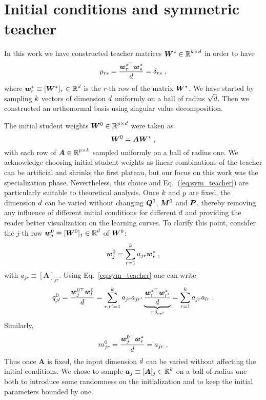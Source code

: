 \section{Initial conditions and symmetric teacher}\label{app:init_cond}

In this work we have constructed teacher matrices $ \W^* \in \R^{\hidt\times\inp} $ in order to have 
\begin{equation}
\label{eq:sym_teacher}
    \prs =  \frac{ \w^{*\top}_r \w^{*}_{s} }{d} = \delta_{rs} \;,
\end{equation}
where $ \w^{*}_r \equiv [\W^*]_r \in \R^\inp $ is the $r$-th row of the matrix $\W^*$. We have started by sampling $\hidt$ vectors of dimension $\inp$ uniformly on a ball of radius $\sqrt{\inp}$. Then we constructed an orthonormal basis using singular value decomposition. 

The initial student weights $\W^0 \in \R^{\hids\times\inp}$ were taken as 
\begin{equation}
\W^0 = \bm{A} \W^*     \;,
\end{equation}
with each row of $\bm{A} \in \R^{\hids \times \hidt}$ sampled uniformly on a ball of radius one. We acknowledge choosing initial student weights as linear combinations of the teacher can be artificial and shrinks the first plateau, but our focus on this work was the specialization phase. Nevertheless, this choice and Eq.~(\ref{eq:sym_teacher}) are particularly suitable to theoretical analysis. Once $\hidt$ and $\hids$ are fixed, the dimension $\inp$ can be varied without changing $ \Q^0$, $\M^0$ and $\P$, thereby removing any influence of different initial conditions for different $\inp$ and providing the reader better visualization on the learning curves. To clarify this point, consider the $j$-th row $ \w^{0}_j \equiv [\W^0]_j \in \R^\inp $ of $\W^0 $:
\begin{equation}
    \w^{0}_j   =  \sum_{r=1}^{\hidt} a_{jr} \w_{r}^*  \;,
\end{equation}
with $ a_{jr} \equiv [ \bm{A}  ]_{jr} $. Using Eq.~\eqref{eq:sym_teacher} one can write
\begin{equation}
\qjl^0 = \frac{\w^{0\top}_j \w^{0}_l }{d} = \sum_{r,r' =1}^{\hidt} a_{jr} a_{j r'}   \underbrace{\frac{\w^{*\top}_r \w^{*}_{r'} }{d}}_{=\delta_{ r r'} } = \sum_{r = 1}^{\hidt} a_{jr} a_{l r} \;.
\end{equation}
Similarly,
\begin{equation}
\mjr^0 =\frac{\w^{0\top}_j \w^{*}_r }{d}  =  a_{jr} \;.
\end{equation}
Thus once $\bm{A}$ is fixed, the input dimension $\inp$ can be varied without affecting the initial conditions. We chose to sample $ \bm{a}_j \equiv [ \bm{A}  ]_j \in \R^\hidt $ on a ball of radius one both to introduce some randomness on the initialization and to keep the initial parameters bounded by one.

